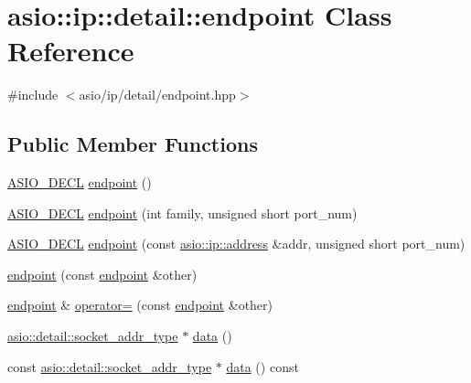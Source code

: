 \hypertarget{classasio_1_1ip_1_1detail_1_1endpoint}{}\section{asio\+:\+:ip\+:\+:detail\+:\+:endpoint Class Reference}
\label{classasio_1_1ip_1_1detail_1_1endpoint}


{\ttfamily \#include $<$asio/ip/detail/endpoint.\+hpp$>$}

\subsection*{Public Member Functions}
\begin{DoxyCompactItemize}
\item 
\hyperlink{config_8hpp_ab54d01ea04afeb9a8b39cfac467656b7}{A\+S\+I\+O\+\_\+\+D\+E\+C\+L} \hyperlink{classasio_1_1ip_1_1detail_1_1endpoint_ae9b74e5512dffd8c1345aa920d7b93f6}{endpoint} ()
\item 
\hyperlink{config_8hpp_ab54d01ea04afeb9a8b39cfac467656b7}{A\+S\+I\+O\+\_\+\+D\+E\+C\+L} \hyperlink{classasio_1_1ip_1_1detail_1_1endpoint_abb98e177f94abf87e732a4a5d30bbfce}{endpoint} (int family, unsigned short port\+\_\+num)
\item 
\hyperlink{config_8hpp_ab54d01ea04afeb9a8b39cfac467656b7}{A\+S\+I\+O\+\_\+\+D\+E\+C\+L} \hyperlink{classasio_1_1ip_1_1detail_1_1endpoint_a4baec745d6b53673fe984e068d98e7f0}{endpoint} (const \hyperlink{classasio_1_1ip_1_1address}{asio\+::ip\+::address} \&addr, unsigned short port\+\_\+num)
\item 
\hyperlink{classasio_1_1ip_1_1detail_1_1endpoint_aa1e05e8571b464bcdb98ff7ef00c5ef3}{endpoint} (const \hyperlink{classasio_1_1ip_1_1detail_1_1endpoint}{endpoint} \&other)
\item 
\hyperlink{classasio_1_1ip_1_1detail_1_1endpoint}{endpoint} \& \hyperlink{classasio_1_1ip_1_1detail_1_1endpoint_ae18141845bbc2a921bdba02451c9fdb6}{operator=} (const \hyperlink{classasio_1_1ip_1_1detail_1_1endpoint}{endpoint} \&other)
\item 
\hyperlink{namespaceasio_1_1detail_a40a7b0385a38f87815ffbb8df5e34d05}{asio\+::detail\+::socket\+\_\+addr\+\_\+type} $\ast$ \hyperlink{classasio_1_1ip_1_1detail_1_1endpoint_a9c0c398c537a440aa84bbb891dccfc99}{data} ()
\item 
const \hyperlink{namespaceasio_1_1detail_a40a7b0385a38f87815ffbb8df5e34d05}{asio\+::detail\+::socket\+\_\+addr\+\_\+type} $\ast$ \hyperlink{classasio_1_1ip_1_1detail_1_1endpoint_ab81d42a9af82b6b59a3ebcb0f2007f6b}{data} () const 

\end{DoxyCompactItemize}
